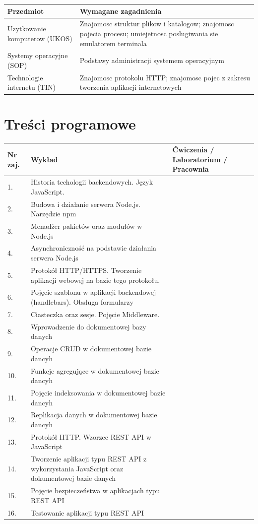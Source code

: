 \documentclass[12pt, a4paper]{article}
\begin{document}
\begin{tabularx}{\textwidth}{lX}
  \hline
  \textbf{Przedmiot} & \textbf{Wymagane zagadnienia} \\
  \hline
  Uzytkowanie komputerow (UKOS) & Znajomosc struktur plikow i katalogow; znajomosc pojecia procesu; umiejetnosc poslugiwania sie emulatorem terminala \\
  Systemy operacyjne (SOP) & Podstawy administracji systemem operacyjnym \\
  Technologie internetu (TIN) & Znajomosc protokolu HTTP; znajomosc pojec z zakresu tworzenia aplikacji internetowych \\
  \hline
\end{tabularx}

\section{Treści programowe}

\begin{longtable}{|p{1.5cm}|p{6.5cm}|p{6.5cm}|}
\hline
\textbf{Nr zaj.} & \textbf{Wykład} & \textbf{Ćwiczenia / Laboratorium / Pracownia} \\\hline
\endhead
  \hline
  1. & Historia techologii backendowych. Język JavaScript. &  \\
  \hline
  2. & Budowa i działanie serwera Node.js. Narzędzie npm &  \\
  \hline
  3. & Menadżer pakietów oraz modułów w Node.js &  \\
  \hline
  4. & Asynchroniczność na podstawie działania serwera Node.js &  \\
  \hline
  5. & Protokół HTTP/HTTPS. Tworzenie aplikacji webowej na bazie tego protokołu. &  \\
  \hline
  6. & Pojęcie szablonu w aplikacji backendowej (handlebars). Obsługa formularzy &  \\
  \hline
  7. & Ciasteczka oraz sesje. Pojęcie Middleware. &  \\
  \hline
  8. & Wprowadzenie do dokumentowej bazy danych &  \\
  \hline
  9. & Operacje CRUD w dokumentowej bazie dancyh &  \\
  \hline
  10. & Funkcje agregujące w dokumentowej bazie dancyh &  \\
  \hline
  11. & Pojęcie indeksowania w dokumentowej bazie dancyh &  \\
  \hline
  12. & Replikacja danych w dokumentowej bazie dancyh &  \\
  \hline
  13. & Protokół HTTP. Wzorzec REST API w JavaScript &  \\
  \hline
  14. & Tworzenie aplikacji typu REST API z wykorzystania JavaScript oraz dokumentowej bazie danych &  \\
  \hline
  15. & Pojęcie bezpieczeństwa w aplikacjach typu REST API &  \\
  \hline
  16. & Testowanie aplikacji typu REST API &  \\
  \hline
\end{longtable}
\end{document}
